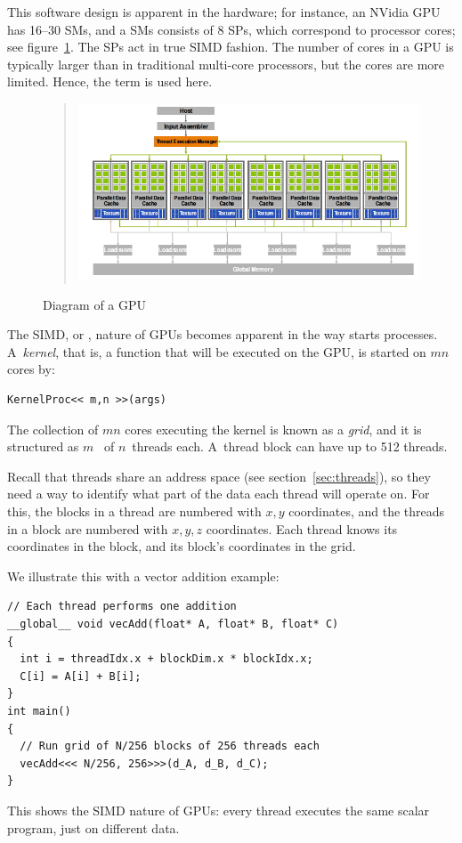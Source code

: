 This software design is apparent in the hardware; for instance, an
NVidia \ac{GPU} has 16--30 \acfp{SM}, and a \acp{SM} consists of 8
\acfp{SP}, which correspond to processor cores; see
figure~\ref{fig:gpu-diagram}. The \acp{SP} act in true SIMD fashion.
The number of cores in a \ac{GPU} is
typically larger than in traditional multi-core processors, but the
cores are more limited. Hence, the term  is used here.

\begin{figure}[ht]
  \begin{quote}
    \includegraphics[scale=.6]{graphics/gpu1}
  \end{quote}
  \caption{Diagram of a GPU}
  \label{fig:gpu-diagram}
\end{figure}

The \ac{SIMD}, or , nature of \acp{GPU} becomes
apparent in the way  starts
processes. A~\emph{kernel}, that is, a function that will
be executed on the \ac{GPU}, is started on $mn$ cores by:
\begin{verbatim}
KernelProc<< m,n >>(args)
\end{verbatim}
The collection of $mn$ cores executing the kernel is known as a
\emph{grid}, and it is structured as
$m$~ of $n$~threads each. 
A~thread block can have up to 512 threads.

Recall that threads share an address space (see
section~\ref{sec:threads}), so they need a way to identify what part
of the data each thread will operate on. For this, the blocks in a
thread are numbered with $x,y$ coordinates, and the threads in a block
are numbered with $x,y,z$ coordinates. Each thread knows its
coordinates in the block, and its block's coordinates in the grid.

We illustrate this with a vector addition example:
\begin{verbatim}
// Each thread performs one addition
__global__ void vecAdd(float* A, float* B, float* C)
{
  int i = threadIdx.x + blockDim.x * blockIdx.x;
  C[i] = A[i] + B[i];
}
int main()
{
  // Run grid of N/256 blocks of 256 threads each
  vecAdd<<< N/256, 256>>>(d_A, d_B, d_C);
}
\end{verbatim}
This shows the \ac{SIMD} nature of \acp{GPU}: every thread executes
the same scalar program, just on different data.


